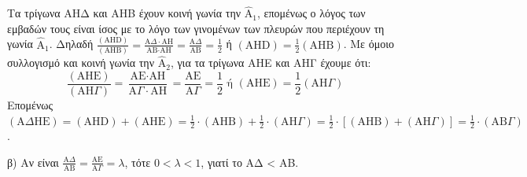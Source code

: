 \begin{alist}
\begin{rlist}
\begin{figure}
\begin{tikzpicture}[scale=0.7]
            \end{tikzpicture}
        \end{figure}
        Τα τρίγωνα ΑΗΔ και ΑΗΒ έχουν κοινή γωνία την $\hat{\text{A}}_1$, επομένως ο λόγος των εμβαδών τους είναι ίσος με το λόγο των γινομένων των πλευρών που περιέχουν τη γωνία $\hat{\text{A}}_1$.
        Δηλαδή $\frac{(\text{AHD})}{(\text{AHB})} = \frac{\text{A}\Delta \cdot \text{AH}}{\text{AB} \cdot \text{AH}} = \frac{\text{A}\Delta}{\text{AB}} = \frac{1}{2}$ ή $(\text{AHD}) = \frac{1}{2} (\text{AHB})$.
        Με όμοιο συλλογισμό και κοινή γωνία την $\hat{\text{A}}_2$, για τα τρίγωνα ΑΗΕ και ΑΗΓ έχουμε ότι:
        \[ \frac{(\text{AHE})}{(\text{AH}\Gamma)} = \frac{\text{AE} \cdot \text{AH}}{\text{A}\Gamma \cdot \text{AH}} = \frac{\text{AE}}{\text{A}\Gamma} = \frac{1}{2} \text{ ή } (\text{AHE}) = \frac{1}{2} (\text{AH}\Gamma) \]
        Επομένως $(\text{A}\Delta\text{H}\text{E}) = (\text{AHD}) + (\text{AHE}) = \frac{1}{2} \cdot (\text{AHB}) + \frac{1}{2} \cdot (\text{AH}\Gamma) = \frac{1}{2} \cdot [(\text{AHB}) + (\text{AH}\Gamma)] = \frac{1}{2} \cdot (\text{AB}\Gamma)$. 
    \end{rlist}
    \item β) Αν είναι $\frac{\text{A}\Delta}{\text{AB}} = \frac{\text{AE}}{\text{A}\Gamma} = \lambda$, τότε $0 < \lambda < 1$, γιατί το ΑΔ < ΑΒ.
    \begin{figure} %
        \centering
\end{figure}
\end{alist}
